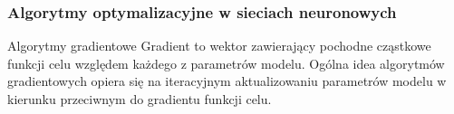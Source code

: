 \documentclass{beamer}
\begin{document}
\begin{frame}
    \frametitle{Algorytmy optymalizacyjne w sieciach neuronowych}
    \begin{block}{Algorytmy gradientowe}
        Gradient to wektor zawierający pochodne cząstkowe funkcji celu względem każdego z parametrów modelu. 
        Ogólna idea algorytmów gradientowych opiera się na iteracyjnym aktualizowaniu parametrów modelu w kierunku przeciwnym do gradientu funkcji celu. 
    \end{block}
\end{frame}
\end{document}
